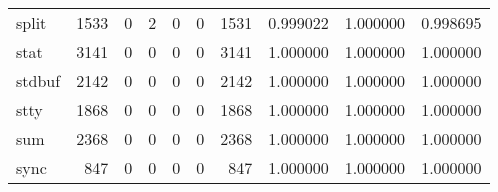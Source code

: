 \begin{tabular}{lrrrrrrrrr}
split     &                                1533 &                                               0 &                                              2 &                                             0 &                                              0 &                                         1531 &                                           0.999022 &                               1.000000 &                             0.998695 \\
stat      &                                3141 &                                               0 &                                              0 &                                             0 &                                              0 &                                         3141 &                                           1.000000 &                               1.000000 &                             1.000000 \\
stdbuf    &                                2142 &                                               0 &                                              0 &                                             0 &                                              0 &                                         2142 &                                           1.000000 &                               1.000000 &                             1.000000 \\
stty      &                                1868 &                                               0 &                                              0 &                                             0 &                                              0 &                                         1868 &                                           1.000000 &                               1.000000 &                             1.000000 \\
sum       &                                2368 &                                               0 &                                              0 &                                             0 &                                              0 &                                         2368 &                                           1.000000 &                               1.000000 &                             1.000000 \\
sync      &                                 847 &                                               0 &                                              0 &                                             0 &                                              0 &                                          847 &                                           1.000000 &                               1.000000 &                             1.000000 \\

\end{tabular}
